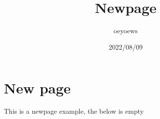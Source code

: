 \documentclass{article}
\title{Newpage}
\author{oeyoews}
\date{2022/08/09}
\begin{document}
\maketitle


\section{New page}%

This is a newpage example, the below is empty

\newpage
\end{document}
